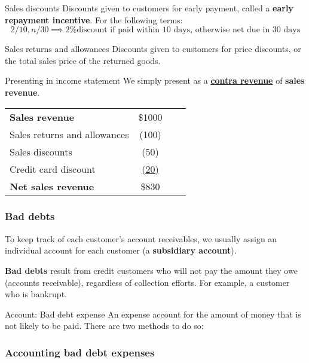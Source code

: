 \begin{theorem}
    {Sales discounts}
    Discounts given to customers for early payment, called a \textbf{early repayment incentive}. For the following terms:
    \[2/10, n/30 \implies \text{2\% discount if paid within 10 days, otherwise net due in 30 days}\]
\end{theorem}

\begin{theorem}
    {Sales returns and allowances}
    Discounts given to customers for price discounts, or the total sales price of the returned goods.
\end{theorem}

\begin{knBox}
    {Presenting in income statement}
    We simply present as a \hyperref[def:contra]{\textbf{contra revenue}} of \textbf{sales revenue}.

    \begin{tabular}{lccc}
        \textbf{Sales revenue}             & \$1000           \\
        \quad Sales returns and allowances & (100)            \\
        \quad Sales discounts              & (50)             \\
        \quad Credit card discount         & \underline{(20)} \\
        \textbf{Net sales revenue}         & \$830            \\
    \end{tabular}
\end{knBox}

\subsubsection{Bad debts}

To keep track of each customer's account receivables, we usually assign an individual account for each customer (a \textbf{subsidiary account}).

\textbf{Bad debts} result from credit customers who will not pay the amount they owe (accounts receivable), regardless of collection efforts. For example, a customer who is bankrupt.

\begin{definition}
    {Account: Bad debt expense}
    An expense account for the amount of money that is not likely to be paid. There are two methods to do so:
\end{definition}


\subsubsection{Accounting bad debt expenses}


